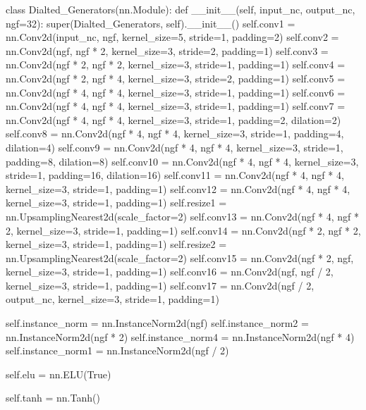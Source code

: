 \documentclass[a4paper]{article}
\begin{document}
\begin{python}
class Dialted_Generators(nn.Module):
    def __init__(self, input_nc, output_nc, ngf=32):
        super(Dialted_Generators, self).__init__()
        self.conv1 = nn.Conv2d(input_nc, ngf, kernel_size=5, stride=1, padding=2)
        self.conv2 = nn.Conv2d(ngf, ngf * 2, kernel_size=3, stride=2, padding=1)
        self.conv3 = nn.Conv2d(ngf * 2, ngf * 2, kernel_size=3, stride=1, padding=1)
        self.conv4 = nn.Conv2d(ngf * 2, ngf * 4, kernel_size=3, stride=2, padding=1)
        self.conv5 = nn.Conv2d(ngf * 4, ngf * 4, kernel_size=3, stride=1, padding=1)
        self.conv6 = nn.Conv2d(ngf * 4, ngf * 4, kernel_size=3, stride=1, padding=1)
        self.conv7 = nn.Conv2d(ngf * 4, ngf * 4, kernel_size=3, stride=1, padding=2, dilation=2)
        self.conv8 = nn.Conv2d(ngf * 4, ngf * 4, kernel_size=3, stride=1, padding=4, dilation=4)
        self.conv9 = nn.Conv2d(ngf * 4, ngf * 4, kernel_size=3, stride=1, padding=8, dilation=8)
        self.conv10 = nn.Conv2d(ngf * 4, ngf * 4, kernel_size=3, stride=1, padding=16, dilation=16)
        self.conv11 = nn.Conv2d(ngf * 4, ngf * 4, kernel_size=3, stride=1, padding=1)
        self.conv12 = nn.Conv2d(ngf * 4, ngf * 4, kernel_size=3, stride=1, padding=1)
        self.resize1 = nn.UpsamplingNearest2d(scale_factor=2)
        self.conv13 = nn.Conv2d(ngf * 4, ngf * 2, kernel_size=3, stride=1, padding=1)
        self.conv14 = nn.Conv2d(ngf * 2, ngf * 2, kernel_size=3, stride=1, padding=1)
        self.resize2 = nn.UpsamplingNearest2d(scale_factor=2)
        self.conv15 = nn.Conv2d(ngf * 2, ngf, kernel_size=3, stride=1, padding=1)
        self.conv16 = nn.Conv2d(ngf, ngf / 2, kernel_size=3, stride=1, padding=1)
        self.conv17 = nn.Conv2d(ngf / 2, output_nc, kernel_size=3, stride=1, padding=1)

        self.instance_norm = nn.InstanceNorm2d(ngf)
        self.instance_norm2 = nn.InstanceNorm2d(ngf * 2)
        self.instance_norm4 = nn.InstanceNorm2d(ngf * 4)
        self.instance_norm1 = nn.InstanceNorm2d(ngf / 2)

        self.elu = nn.ELU(True)

        self.tanh = nn.Tanh()


\end{python}
\end{document}
